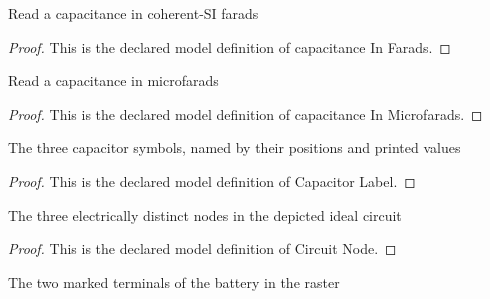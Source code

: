 \begin{definition}
  \label{def:physics:phyx-mini-0877:phyxminiproblems-problemphyxmini0877-capacitanceinfarads}
  Read a capacitance in coherent-SI farads
\end{definition}
\begin{proof}
  This is the declared model definition of capacitance In Farads.
\end{proof}
\begin{definition}
  \label{def:physics:phyx-mini-0877:phyxminiproblems-problemphyxmini0877-capacitanceinmicrofarads}
  Read a capacitance in microfarads
\end{definition}
\begin{proof}
  This is the declared model definition of capacitance In Microfarads.
\end{proof}
\begin{definition}
  \label{def:physics:phyx-mini-0877:phyxminiproblems-problemphyxmini0877-capacitorlabel}
  The three capacitor symbols, named by their positions and printed values
\end{definition}
\begin{proof}
  This is the declared model definition of Capacitor Label.
\end{proof}
\begin{definition}
  \label{def:physics:phyx-mini-0877:phyxminiproblems-problemphyxmini0877-circuitnode}
  The three electrically distinct nodes in the depicted ideal circuit
\end{definition}
\begin{proof}
  This is the declared model definition of Circuit Node.
\end{proof}
\begin{definition}
  \label{def:physics:phyx-mini-0877:phyxminiproblems-problemphyxmini0877-batteryterminal}
  The two marked terminals of the battery in the raster
\end{definition}

